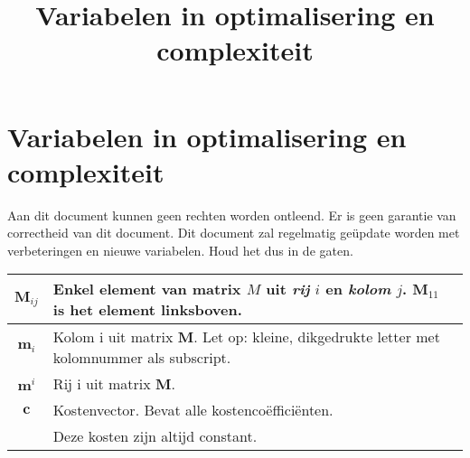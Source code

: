 \documentclass[10pt,a4paper]{article}
\title{Variabelen in optimalisering en complexiteit}
\author{}
\date{}
\begin{document}
\section*{Variabelen in optimalisering en complexiteit}

Aan dit document kunnen geen rechten worden ontleend. Er is geen garantie van correctheid van dit document. Dit document zal regelmatig geüpdate worden met verbeteringen en nieuwe variabelen. Houd het dus in de gaten.


\begin{tabular}{|c|l|}
\hline
$\textbf{M}_{ij}$ & Enkel element van matrix $M$ uit \textit{rij} $i$ en \textit{kolom} $j$. $\textbf{M}_{11}$ is het element linksboven.\\
\hline
$\textbf{m}_i$ & Kolom i uit matrix $\textbf{M}$. Let op: kleine, dikgedrukte letter met kolomnummer als subscript. \\
\hline
$\textbf{m}^i$ & Rij i uit matrix $\textbf{M}$. \\
\hline 
$\textbf{c}$ & Kostenvector. Bevat alle kostencoëfficiënten.\\ & Deze kosten zijn altijd constant.\\ 


\end{tabular}
\end{document}
